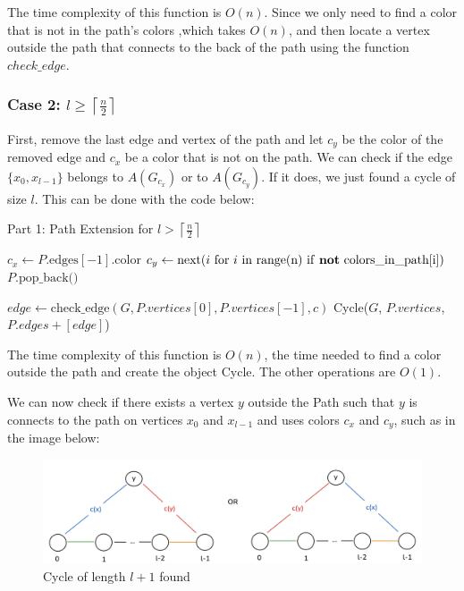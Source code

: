The time complexity of this function is \( O(n) \). Since we 
only need to find a color that is not in the path’s colors 
,which takes \( O(n) \), and then locate a vertex outside 
the path that connects to the back of the path using the 
function $check\_edge$.

\subsubsection{Case 2: \( l \geq \left \lceil \frac{n}{2} \right \rceil \)}

First, remove the last edge and
vertex of the path and let $c_y$ be the color of the removed edge and $c_x$ 
be a color that is not on the path.
We can check if the edge $\{x_0, x_{l-1}\}$ belongs to $A(G_{c_x})$ or
to $A(G_{c_y})$. If it does, we just found a cycle of size $l$. 
This can be done with the code below:

\begin{algorithm}[H]
    \caption{Part 1: Path Extension for \( l > \left \lceil \frac{n}{2} \right \rceil \)}
    \begin{algorithmic}
            \State $c_x \gets P.\text{edges}[-1].\text{color}$ 
            \State $c_y \gets \text{next}(i \text{ for } i \text{ in range(n) if \textbf{not} colors\_in\_path[i]})$
            \State $P.\text{pop\_back()}$ 

                \State $edge \gets \text{check\_edge}(G, P.vertices[0], P.vertices[-1], c)$
                    \State \Return Cycle($G$, $P.vertices$, $P.edges + [edge]$) 
                \EndIf
            \EndFor
        \EndFunction
    \end{algorithmic}
\end{algorithm}

The time complexity of this function is $O(n)$, the time needed
to find a color outside the path and create the object Cycle. The other
operations are $O(1)$.

We can now check if there exists a vertex $y$ outside the Path
such that $y$ is connects to the path on vertices $x_0$ and $x_{l-1}$
and uses colors $c_x$ and $c_y$, such as in the image below:

\begin{figure}[H]
    \centering
    \includegraphics[width=1\textwidth]{figuras/path_vertex_outside.png}
    \caption{Cycle of length \( l + 1 \) found}
    \label{fig:path_vertex_outside}
\end{figure}

